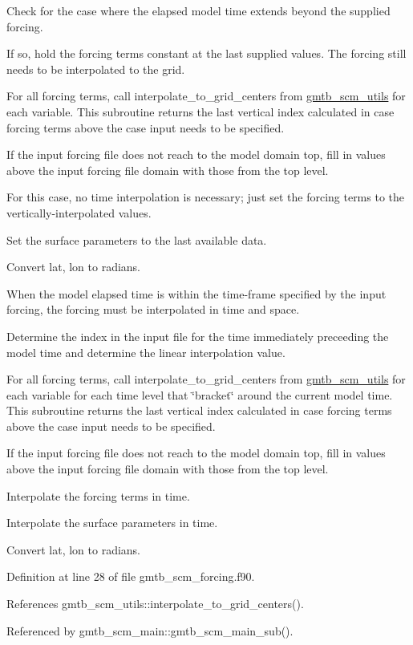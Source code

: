 \begin{DoxyItemize}
\item Check for the case where the elapsed model time extends beyond the supplied forcing.
\begin{DoxyItemize}
\item If so, hold the forcing terms constant at the last supplied values. The forcing still needs to be interpolated to the grid.
\item For all forcing terms, call interpolate\+\_\+to\+\_\+grid\+\_\+centers from \hyperlink{group__utils}{gmtb\+\_\+scm\+\_\+utils} for each variable. This subroutine returns the last vertical index calculated in case forcing terms above the case input needs to be specified.
\item If the input forcing file does not reach to the model domain top, fill in values above the input forcing file domain with those from the top level.
\item For this case, no time interpolation is necessary; just set the forcing terms to the vertically-\/interpolated values.
\item Set the surface parameters to the last available data.
\item Convert lat, lon to radians.
\end{DoxyItemize}
\item When the model elapsed time is within the time-\/frame specified by the input forcing, the forcing must be interpolated in time and space.
\begin{DoxyItemize}
\item Determine the index in the input file for the time immediately preceeding the model time and determine the linear interpolation value.
\item For all forcing terms, call interpolate\+\_\+to\+\_\+grid\+\_\+centers from \hyperlink{group__utils}{gmtb\+\_\+scm\+\_\+utils} for each variable for each time level that \char`\"{}bracket\char`\"{} around the current model time. This subroutine returns the last vertical index calculated in case forcing terms above the case input needs to be specified.
\item If the input forcing file does not reach to the model domain top, fill in values above the input forcing file domain with those from the top level.
\item Interpolate the forcing terms in time.
\item Interpolate the surface parameters in time.
\item Convert lat, lon to radians.
\end{DoxyItemize}
\end{DoxyItemize}

Definition at line 28 of file gmtb\+\_\+scm\+\_\+forcing.\+f90.



References gmtb\+\_\+scm\+\_\+utils\+::interpolate\+\_\+to\+\_\+grid\+\_\+centers().



Referenced by gmtb\+\_\+scm\+\_\+main\+::gmtb\+\_\+scm\+\_\+main\+\_\+sub().

